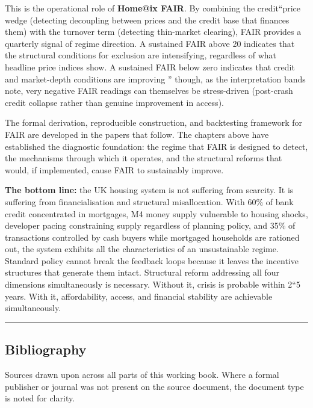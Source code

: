 \documentclass[
]{article}
\begin{document}
This is the operational role of \textbf{Home@ix FAIR}. By combining the
credit``price wedge (detecting decoupling between prices and the credit
base that finances them) with the turnover term (detecting thin-market
clearing), FAIR provides a quarterly signal of regime direction. A
sustained FAIR above 20 indicates that the structural conditions for
exclusion are intensifying, regardless of what headline price indices
show. A sustained FAIR below zero indicates that credit and market-depth
conditions are improving '' though, as the interpretation bands note,
very negative FAIR readings can themselves be stress-driven (post-crash
credit collapse rather than genuine improvement in access).

The formal derivation, reproducible construction, and backtesting
framework for FAIR are developed in the papers that follow. The chapters
above have established the diagnostic foundation: the regime that FAIR
is designed to detect, the mechanisms through which it operates, and the
structural reforms that would, if implemented, cause FAIR to sustainably
improve.

\textbf{The bottom line:} the UK housing system is not suffering from
scarcity. It is suffering from financialisation and structural
misallocation. With 60\% of bank credit concentrated in mortgages, M4
money supply vulnerable to housing shocks, developer pacing constraining
supply regardless of planning policy, and 35\% of transactions
controlled by cash buyers while mortgaged households are rationed out,
the system exhibits all the characteristics of an unsustainable regime.
Standard policy cannot break the feedback loops because it leaves the
incentive structures that generate them intact. Structural reform
addressing all four dimensions simultaneously is necessary. Without it,
crisis is probable within 2``5 years. With it, affordability, access,
and financial stability are achievable simultaneously.

\begin{center}\rule{0.5\linewidth}{0.5pt}\end{center}

\subsection{Bibliography}\label{bibliography}

Sources drawn upon across all parts of this working book. Where a formal
publisher or journal was not present on the source document, the
document type is noted for clarity.
\end{document}
